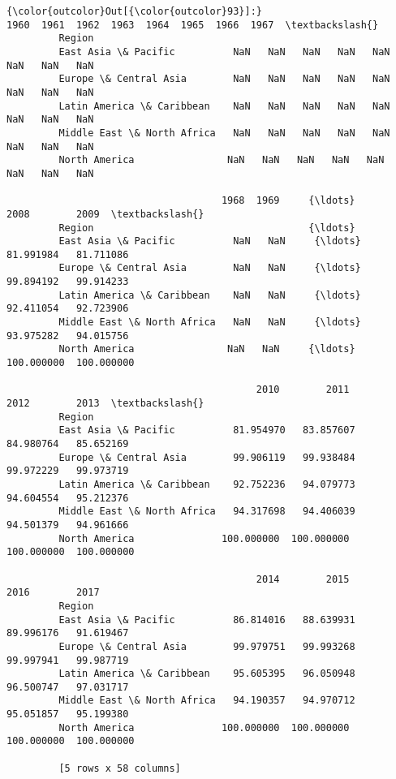 \documentclass[11pt]{article}
\begin{document}
\begin{Verbatim}[commandchars=\\\{\}]
{\color{outcolor}Out[{\color{outcolor}93}]:}                             1960  1961  1962  1963  1964  1965  1966  1967  \textbackslash{}
         Region                                                                       
         East Asia \& Pacific          NaN   NaN   NaN   NaN   NaN   NaN   NaN   NaN   
         Europe \& Central Asia        NaN   NaN   NaN   NaN   NaN   NaN   NaN   NaN   
         Latin America \& Caribbean    NaN   NaN   NaN   NaN   NaN   NaN   NaN   NaN   
         Middle East \& North Africa   NaN   NaN   NaN   NaN   NaN   NaN   NaN   NaN   
         North America                NaN   NaN   NaN   NaN   NaN   NaN   NaN   NaN   
         
                                     1968  1969     {\ldots}            2008        2009  \textbackslash{}
         Region                                     {\ldots}                               
         East Asia \& Pacific          NaN   NaN     {\ldots}       81.991984   81.711086   
         Europe \& Central Asia        NaN   NaN     {\ldots}       99.894192   99.914233   
         Latin America \& Caribbean    NaN   NaN     {\ldots}       92.411054   92.723906   
         Middle East \& North Africa   NaN   NaN     {\ldots}       93.975282   94.015756   
         North America                NaN   NaN     {\ldots}      100.000000  100.000000   
         
                                           2010        2011        2012        2013  \textbackslash{}
         Region                                                                       
         East Asia \& Pacific          81.954970   83.857607   84.980764   85.652169   
         Europe \& Central Asia        99.906119   99.938484   99.972229   99.973719   
         Latin America \& Caribbean    92.752236   94.079773   94.604554   95.212376   
         Middle East \& North Africa   94.317698   94.406039   94.501379   94.961666   
         North America               100.000000  100.000000  100.000000  100.000000   
         
                                           2014        2015        2016        2017  
         Region                                                                      
         East Asia \& Pacific          86.814016   88.639931   89.996176   91.619467  
         Europe \& Central Asia        99.979751   99.993268   99.997941   99.987719  
         Latin America \& Caribbean    95.605395   96.050948   96.500747   97.031717  
         Middle East \& North Africa   94.190357   94.970712   95.051857   95.199380  
         North America               100.000000  100.000000  100.000000  100.000000  
         
         [5 rows x 58 columns]
\end{Verbatim}
            
\end{document}
